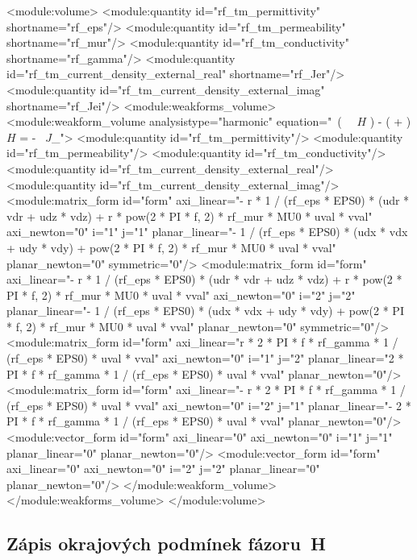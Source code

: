 \documentclass[12pt,a4paper,oneside]{article}
\numberwithin{equation}{section} %
\numberwithin{figure}{section} %
\numberwithin{table}{section} %
\newcommand{\mj}{\mathrm{j}} %
\newcommand{\vecfaz}[1]{\mbox{\underline{\boldmath$#1$}}} %
\newcommand{\curl}{\mathrm{curl}\ }
\begin{document}
\begin{spverbatim}
<module:volume>
    <module:quantity id="rf_tm_permittivity" shortname="rf_eps"/>
    <module:quantity id="rf_tm_permeability" shortname="rf_mur"/>
    <module:quantity id="rf_tm_conductivity" shortname="rf_gamma"/>
    <module:quantity id="rf_tm_current_density_external_real" shortname="rf_Jer"/>
    <module:quantity id="rf_tm_current_density_external_imag" shortname="rf_Jei"/>
    <module:weakforms_volume>
      <module:weakform_volume analysistype="harmonic" equation="\curl \left( \, \curl \vecfaz{H} \right) - \mj \omega \left( \sigma + \mj \omega \varepsilon \right) \vecfaz{H} = - \curl \vecfaz{J}_{}">
        <module:quantity id="rf_tm_permittivity"/>
        <module:quantity id="rf_tm_permeability"/>
        <module:quantity id="rf_tm_conductivity"/>
        <module:quantity id="rf_tm_current_density_external_real"/>
        <module:quantity id="rf_tm_current_density_external_imag"/>
        <module:matrix_form id="form" axi_linear="- r * 1 / (rf_eps * EPS0) * (udr * vdr + udz * vdz) + r * pow(2 * PI * f, 2) * rf_mur * MU0 * uval * vval" axi_newton="0" i="1" j="1" planar_linear="- 1 / (rf_eps * EPS0) * (udx * vdx + udy * vdy) + pow(2 * PI * f, 2) * rf_mur * MU0 * uval * vval" planar_newton="0" symmetric="0"/>
        <module:matrix_form id="form" axi_linear="- r * 1 / (rf_eps * EPS0) * (udr * vdr + udz * vdz) + r * pow(2 * PI * f, 2) * rf_mur * MU0 * uval * vval" axi_newton="0" i="2" j="2" planar_linear="- 1 / (rf_eps * EPS0) * (udx * vdx + udy * vdy) + pow(2 * PI * f, 2) * rf_mur * MU0 * uval * vval" planar_newton="0" symmetric="0"/>
        <module:matrix_form id="form" axi_linear="r * 2 * PI * f * rf_gamma * 1 / (rf_eps * EPS0) * uval * vval" axi_newton="0" i="1" j="2" planar_linear="2 * PI * f * rf_gamma * 1 / (rf_eps * EPS0) * uval * vval" planar_newton="0"/>
        <module:matrix_form id="form" axi_linear="- r * 2 * PI * f * rf_gamma * 1 / (rf_eps * EPS0) * uval * vval" axi_newton="0" i="2" j="1" planar_linear="- 2 * PI * f * rf_gamma * 1 / (rf_eps * EPS0) * uval * vval" planar_newton="0"/>
        <module:vector_form id="form" axi_linear="0" axi_newton="0" i="1" j="1" planar_linear="0" planar_newton="0"/>
        <module:vector_form id="form" axi_linear="0" axi_newton="0" i="2" j="2" planar_linear="0" planar_newton="0"/>
     </module:weakform_volume>
    </module:weakforms_volume>
  </module:volume>
\end{spverbatim}


\subsection*{Zápis okrajových podmínek fázoru~H}
\label{XMLHs}
\end{document}
